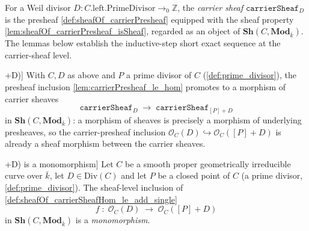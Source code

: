 \begin{definition}

  \label{def:sheafOf_carrierSheaf}
  For a Weil divisor \(D : C.\text{left.PrimeDivisor} \to_0 \mathbb Z\), the
  \emph{carrier sheaf} \(\texttt{carrierSheaf}_D\) is the presheaf
  \cref{def:sheafOf_carrierPresheaf} equipped with the sheaf property
  \cref{lem:sheafOf_carrierPresheaf_isSheaf}, regarded as an object of
  \(\mathbf{Sh}(C, \mathbf{Mod}_{\bar k})\). The lemmas below establish
  the inductive-step short exact sequence at the carrier-sheaf level.
\end{definition}

\begin{definition}

\leanok
[Sheaf-level inclusion \(\mathcal O_C(D) \hookrightarrow \mathcal O_C([P]+D)\)]
  \label{def:sheafOf_carrierSheafHom_le_add_single}
  With \(C, D\) as above and \(P\) a prime divisor of \(C\)
  (\cref{def:prime_divisor}), the presheaf inclusion
  \cref{lem:carrierPresheaf_le_hom} promotes to a morphism of carrier sheaves
  \[
    \texttt{carrierSheaf}_D \;\longrightarrow\;
    \texttt{carrierSheaf}_{[P]+D}
  \]
  in \(\mathbf{Sh}(C, \mathbf{Mod}_{\bar k})\): a morphism of sheaves is
  precisely a morphism of underlying presheaves, so the carrier-presheaf
  inclusion \(\mathcal O_C(D) \hookrightarrow \mathcal O_C([P]+D)\) is already a
  sheaf morphism between the carrier sheaves.
\end{definition}

\begin{lemma}

\leanok
[The inclusion \(\mathcal O_C(D) \hookrightarrow \mathcal O_C([P]+D)\) is a
monomorphism]
  \label{lem:sheafOf_mono_single_add}
  Let \(C\) be a smooth proper geometrically irreducible curve over
  \(\bar k\), let \(D \in \mathrm{Div}(C)\) and let \(P\) be a closed point of
  \(C\) (a prime divisor, \cref{def:prime_divisor}). The sheaf-level inclusion
  of \cref{def:sheafOf_carrierSheafHom_le_add_single}
  \[
    f \;\colon\; \mathcal O_C(D) \;\longrightarrow\; \mathcal O_C([P]+D)
  \]
  in \(\mathbf{Sh}(C, \mathbf{Mod}_{\bar k})\) is a \emph{monomorphism}.
\end{lemma}

